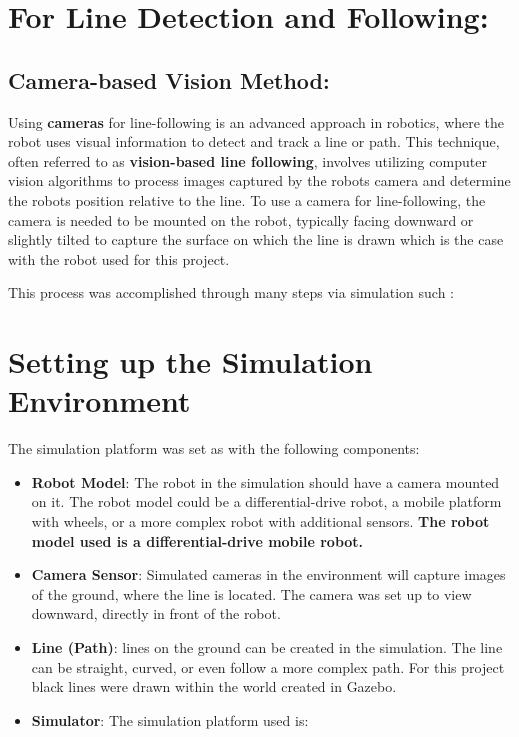 \documentclass[../../main]{subfiles}
\begin{document}
    \section{For Line Detection and Following:}
    
    \subsection{Camera-based Vision Method:}
    
    Using \textbf{cameras} for line-following is an advanced approach in
    robotics, where the robot uses visual information to detect and track a
    line or path. This technique, often referred to as \textbf{vision-based
    line following}, involves utilizing computer vision algorithms to
    process images captured by the robot\textquotesingle s camera and
    determine the robot\textquotesingle s position relative to the line. To
    use a camera for line-following, the camera is needed to be mounted on
    the robot, typically facing downward or slightly tilted to capture the
    surface on which the line is drawn which is the case with the robot used
    for this project.
    
    This process was accomplished through many steps via simulation such :
    

    \section*{Setting up the Simulation Environment}

    
    The simulation platform was set as with the following components:
    
    \begin{itemize}
    \item
      \textbf{Robot Model}: The robot in the simulation should have a camera
      mounted on it. The robot model could be a differential-drive robot, a
      mobile platform with wheels, or a more complex robot with additional
      sensors. \textbf{The robot model used is a differential-drive mobile
      robot.}
    \item
      \textbf{Camera Sensor}: Simulated cameras in the environment will
      capture images of the ground, where the line is located. The camera
      was set up to view downward, directly in front of the robot.
    \item
      \textbf{Line (Path)}: lines on the ground can be created in the
      simulation. The line can be straight, curved, or even follow a more
      complex path. For this project black lines were drawn within the world
      created in Gazebo.
    \item
      \textbf{Simulator}: The simulation platform used is:
    \end{itemize}
    
\end{document}
